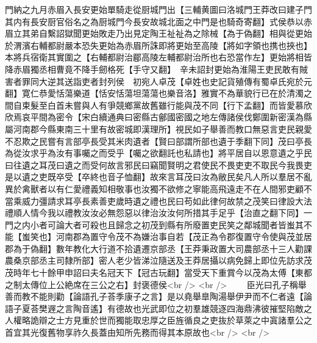 門納之九月赤眉入長安更始單騎走從厨城門出【三輔黄圖曰洛城門王莽改曰建子門其内有長安厨官俗名之為厨城門今長安故城北面之中門是也騎奇寄翻】式侯恭以赤眉立其弟自繫詔獄聞更始敗走乃出見定陶王祉祉為之除械【為于偽翻】相與從更始於渭濱右輔都尉嚴本恐失更始為赤眉所誅即將更始至高陵【將如字領也携也挾也】本將兵宿衛其實圍之【右輔都尉治郿高陵左輔都尉治所也右恐當作左】更始將相皆降赤眉獨丞相曹竟不降手劒格死【手守又翻】　辛未詔封更始為淮陽王吏民敢有賊害者罪同大逆其送詣吏者封列侯　初宛人卓茂【卓姓也史記貨殖傳有蜀卓氏宛於元翻】寛仁恭愛恬蕩樂道【恬安恬蕩坦蕩蕩也樂音洛】雅實不為華貌行已在於清濁之間自束髮至白首未嘗與人有爭競鄉黨故舊雖行能與茂不同【行下孟翻】而皆愛慕欣欣焉哀平間為密令【宋白續通典曰密縣古鄶國密國之地左傳諸侯伐鄭圍新密漢為縣屬河南郡今縣東南三十里有故密城即漢理所】視民如子舉善而教口無惡言吏民親愛不忍欺之民嘗有言部亭長受其米肉遺者【賢曰部謂所部也遺于季翻下同】茂曰亭長為從汝求乎為汝有事囑之而受乎【囑之欲翻託也私請也】將平居自以恩意遺之乎民曰往遺之耳茂曰遺之而受何故言邪民曰竊聞賢明之君使民不畏吏吏不取民今我畏吏是以遺之吏既卒受【卒終也音子恤翻】故來言耳茂曰汝為敝民矣凡人所以羣居不亂異於禽獸者以有仁愛禮義知相敬事也汝獨不欲修之寧能高飛遠走不在人間邪吏顧不當乘威力彊請求耳亭長素善吏歲時遺之禮也民曰苟如此律何故禁之茂笑曰律設大法禮順人情今我以禮教汝汝必無怨惡以律治汝汝何所措其手足乎【治直之翻下同】一門之内小者可論大者可殺也且歸念之初茂到縣有所廢置吏民笑之鄰城聞者皆蚩其不能【蚩笑也】河南郡為置守令茂不為嫌治事自若【茂正為令郡復置守令使與茂並居郡為于偽翻】數年教化大行道不拾遺遷京部丞【王莽秉政置大司農部丞十三人勸課農桑京部丞主司隸所部】密人老少皆涕泣隨送及王莽居攝以病免歸上即位先訪求茂茂時年七十餘甲申詔曰夫名冠天下【冠古玩翻】當受天下重賞今以茂為太傅【東都之制太傳位上公絶席在三公之右】封褒德侯<br />
<br />
　　臣光曰孔子稱舉善而教不能則勸【論語孔子荅季康子之言】是以堯舉臯陶湯舉伊尹而不仁者遠【論語子夏荅樊遟之言陶音遙】有德故也光武即位之初羣雄競逐四海鼎沸彼摧堅陷敵之人權略詭辯之士方見重於世而獨能取忠厚之臣旌循良之吏抜於草萊之中寘諸羣公之首宜其光復舊物享祚久長蓋由知所先務而得其本原故也<br />
<br />
